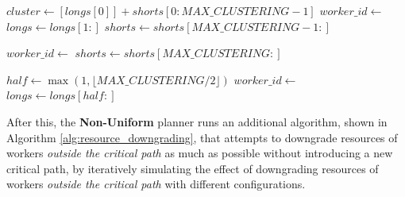 \begin{algorithm}
\begin{algorithmic}[1]
        \Statex
        \State {}
            \State $cluster \gets [longs[0]] + shorts[0:MAX\_CLUSTERING-1]$
            \State $worker\_id \gets$ 
            \State {}
            \State $longs \gets longs[1:]$
            \State $shorts \gets shorts[MAX\_CLUSTERING-1:]$
        \EndWhile
        
        \Statex
        \State {}
            \State $worker\_id \gets$ 
            \State {}
            \State $shorts \gets shorts[MAX\_CLUSTERING:]$
        \EndWhile
        
        \Statex
        \State {}
        \State $half \gets \max(1, \lfloor MAX\_CLUSTERING / 2 \rfloor)$
            \State $worker\_id \gets$ 
            \State {}
            \State $longs \gets longs[half:]$
        \EndWhile
    \EndFunction
\end{algorithmic}
\end{algorithm}


After this, the \textbf{Non-Uniform} planner runs an additional algorithm, shown in Algorithm \ref{alg:resource_downgrading}, that attempts to downgrade resources of workers \textit{outside the critical path} as much as possible without introducing a new critical path, by iteratively simulating the effect of downgrading resources of workers \textit{outside the critical path} with different configurations.

